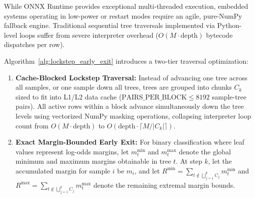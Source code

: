 While ONNX Runtime provides exceptional multi-threaded execution, embedded systems operating in low-power or restart modes require an agile, pure-NumPy fallback engine. Traditional sequential tree traversals implemented via Python-level loops suffer from severe interpreter overhead ($O(M \cdot \text{depth})$ bytecode dispatches per row).

Algorithm~\ref{alg:lockstep_early_exit} introduces a two-tier traversal optimization:
\begin{enumerate}
    \item \textbf{Cache-Blocked Lockstep Traversal:} Instead of advancing one tree across all samples, or one sample down all trees, trees are grouped into chunks $C_k$ sized to fit into L1/L2 data cache ($\text{PAIRS\_PER\_BLOCK} \le 8192$ sample-tree pairs). All active rows within a block advance simultaneously down the tree levels using vectorized NumPy masking operations, collapsing interpreter loop count from $O(M \cdot \text{depth})$ to $O(\text{depth} \cdot \lceil M / |C_k| \rceil)$.
    \item \textbf{Exact Margin-Bounded Early Exit:} For binary classification where leaf values represent log-odds margins, let $m_t^{\min}$ and $m_t^{\max}$ denote the global minimum and maximum margins obtainable in tree $t$. At step $k$, let the accumulated margin for sample $i$ be $m_i$, and let $R^{\min} = \sum_{t \notin \bigcup_{j=1}^k C_j} m_t^{\min}$ and $R^{\max} = \sum_{t \notin \bigcup_{j=1}^k C_j} m_t^{\max}$ denote the remaining extremal margin bounds.
\end{enumerate}

